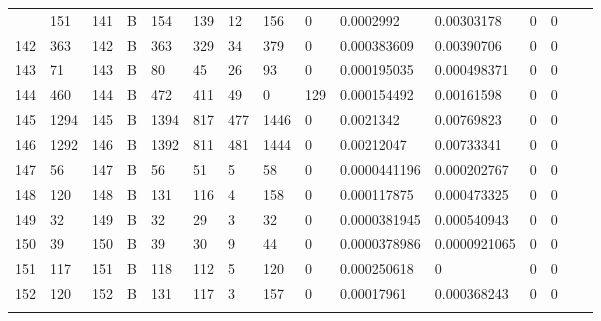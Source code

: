 \begin{longtable}{lllllllllllllll}
\begin{comment}
	141 & 151               & 141 & B   & 154               & 139               & 12                & 156  & 0          & 0.0002992      & 0.00303178     & 0             & 0            \\
	142 & 363               & 142 & B   & 363               & 329               & 34                & 379  & 0          & 0.000383609    & 0.00390706     & 0             & 0            \\
	143 & 71                & 143 & B   & 80                & 45                & 26                & 93   & 0          & 0.000195035    & 0.000498371    & 0             & 0            \\
	144 & 460               & 144 & B   & 472               & 411               & 49                & 0    & 129        & 0.000154492    & 0.00161598     & 0             & 0            \\
	145 & 1294              & 145 & B   & 1394              & 817               & 477               & 1446 & 0          & 0.0021342      & 0.00769823     & 0             & 0            \\
	146 & 1292              & 146 & B   & 1392              & 811               & 481               & 1444 & 0          & 0.00212047     & 0.00733341     & 0             & 0            \\
	147 & 56                & 147 & B   & 56                & 51                & 5                 & 58   & 0          & 0.0000441196   & 0.000202767    & 0             & 0            \\
	148 & 120               & 148 & B   & 131               & 116               & 4                 & 158  & 0          & 0.000117875    & 0.000473325    & 0             & 0            \\
	149 & 32                & 149 & B   & 32                & 29                & 3                 & 32   & 0          & 0.0000381945   & 0.000540943    & 0             & 0            \\
	150 & 39                & 150 & B   & 39                & 30                & 9                 & 44   & 0          & 0.0000378986   & 0.0000921065   & 0             & 0            \\
	151 & 117               & 151 & B   & 118               & 112               & 5                 & 120  & 0          & 0.000250618    & 0              & 0             & 0            \\
	152 & 120               & 152 & B   & 131               & 117               & 3                 & 157  & 0          & 0.00017961     & 0.000368243    & 0             & 0            \\

\end{comment}
\end{longtable}
